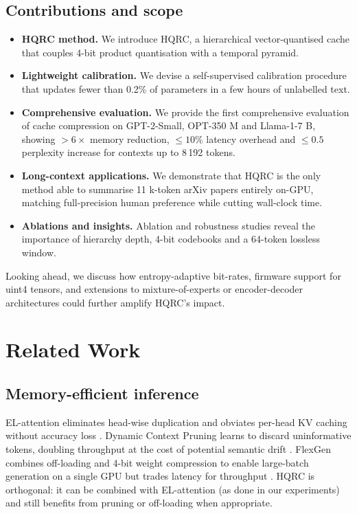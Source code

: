 \documentclass{article}
\begin{document}
\subsection{Contributions and scope}
\begin{itemize}
  \item \textbf{HQRC method.} We introduce HQRC, a hierarchical vector-quantised cache that couples 4-bit product quantisation with a temporal pyramid.
  \item \textbf{Lightweight calibration.} We devise a self-supervised calibration procedure that updates fewer than 0.2\% of parameters in a few hours of unlabelled text.
  \item \textbf{Comprehensive evaluation.} We provide the first comprehensive evaluation of cache compression on GPT-2-Small, OPT-350 M and Llama-1-7 B, showing \(>6\times\) memory reduction, \(\leq 10\%\) latency overhead and \(\leq 0.5\) perplexity increase for contexts up to 8\,192 tokens.
  \item \textbf{Long-context applications.} We demonstrate that HQRC is the only method able to summarise 11 k-token arXiv papers entirely on-GPU, matching full-precision human preference while cutting wall-clock time.
  \item \textbf{Ablations and insights.} Ablation and robustness studies reveal the importance of hierarchy depth, 4-bit codebooks and a 64-token lossless window.
\end{itemize}

Looking ahead, we discuss how entropy-adaptive bit-rates, firmware support for uint4 tensors, and extensions to mixture-of-experts or encoder-decoder architectures could further amplify HQRC’s impact.

\section{Related Work}
\subsection{Memory-efficient inference}
EL-attention eliminates head-wise duplication and obviates per-head KV caching without accuracy loss \cite{yan-2021-attention}. Dynamic Context Pruning learns to discard uninformative tokens, doubling throughput at the cost of potential semantic drift \cite{anagnostidis-2023-dynamic}. FlexGen combines off-loading and 4-bit weight compression to enable large-batch generation on a single GPU but trades latency for throughput \cite{sheng-2023-flexgen}. HQRC is orthogonal: it can be combined with EL-attention (as done in our experiments) and still benefits from pruning or off-loading when appropriate.
\end{document}
